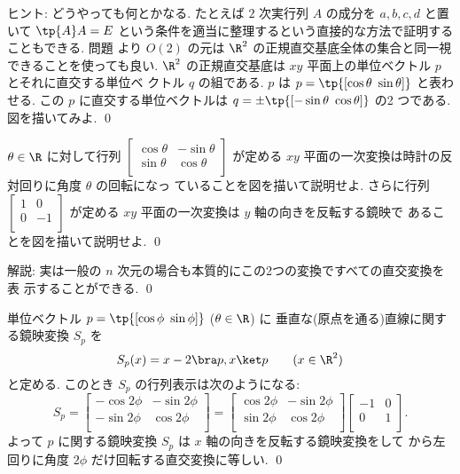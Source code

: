 \documentclass[12pt,twoside]{jarticle}
\begin{document}
\noindent
ヒント: どうやっても何とかなる. たとえば $2$ 次実行列 $A$ の成分を $a,b,c,d$ 
と置いて $\tp{A}A=E$ という条件を適当に整理するという直接的な方法で証明する
こともできる.  問題  より $O(2)$ の元は $\R^2$ 
の正規直交基底全体の集合と同一視できることを使っても良い.  
$\R^2$ の正規直交基底は $xy$ 平面上の単位ベクトル $p$ とそれに直交する単位ベ
クトル $q$ の組である. $p$ は $p=\tp{[\cos\theta\ \sin\theta]}$ と表わせる.
この $p$ に直交する単位ベクトルは $q=\pm\tp{[-\sin\theta\ \cos\theta]}$ の2
つである.  図を描いてみよ.
\qed


\begin{question}
  $\theta\in\R$ に対して行列 $
  \begin{bmatrix}
    \cos\theta & -\sin\theta \\
    \sin\theta &  \cos\theta \\
  \end{bmatrix}
  $ が定める $xy$ 平面の一次変換は時計の反対回りに角度 $\theta$ の回転になっ
  ていることを図を描いて説明せよ. 
  さらに行列 $
  \begin{bmatrix}
    1 &  0 \\
    0 & -1 \\
  \end{bmatrix}
  $ が定める $xy$ 平面の一次変換は $y$ 軸の向きを反転する鏡映で
  あることを図を描いて説明せよ.  \qed
\end{question}

\noindent
解説: 実は一般の $n$ 次元の場合も本質的にこの2つの変換ですべての直交変換を表
示することができる.
\qed


\begin{question}
  単位ベクトル $p=\tp{[\cos\phi\ \sin\phi]}$ ($\theta\in\R$) に
  垂直な(原点を通る)直線に関する鏡映変換 $S_p$ を
  \begin{equation*}
    S_p(x) = x - 2\bra p,x\ket p   \qquad (x\in\R^2)
  \end{equation*}
  と定める.  このとき $S_p$ の行列表示は次のようになる:
  \begin{equation*}
    S_p = 
    \begin{bmatrix}
      -\cos 2\phi & -\sin 2\phi \\
      -\sin 2\phi &  \cos 2\phi \\
    \end{bmatrix}
    =
    \begin{bmatrix}
      \cos 2\phi & -\sin 2\phi \\
      \sin 2\phi &  \cos 2\phi \\
    \end{bmatrix}
    \begin{bmatrix}
      -1 & 0 \\
       0 & 1 \\
    \end{bmatrix}.
  \end{equation*}
  よって $p$ に関する鏡映変換 $S_p$ は $x$ 軸の向きを反転する鏡映変換をして
  から左回りに角度 $2\phi$ だけ回転する直交変換に等しい.
  \qed
\end{question}
\end{document}
